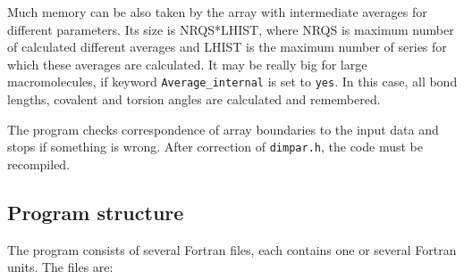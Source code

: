 \documentclass{article}
\begin{document}
Much memory can be also taken by the array with intermediate averages for 
different parameters.  Its size is NRQS*LHIST, where NRQS is maximum number 
of calculated different averages and LHIST is the maximum number of series 
for which these averages are calculated. It may be really big 
for large macromolecules, if keyword \verb|Average_internal| is set to 
\verb|yes|. In this case, all bond lengths, covalent and torsion 
angles are calculated and remembered. 

The program checks correspondence of array boundaries to the input data and
stops if something is wrong. After correction of \verb|dimpar.h|, the code
must be recompiled.
                    

\subsection{Program structure}


The program consists of several Fortran files, each contains one
or several Fortran units. The files are:
\end{document}
